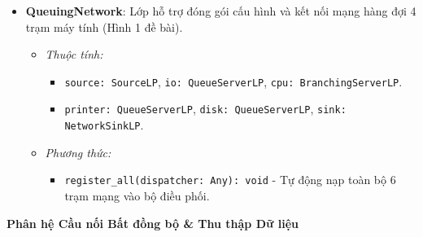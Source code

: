 \begin{itemize}[leftmargin=1.5em, itemsep=8pt]
\item \textbf{QueuingNetwork}: Lớp hỗ trợ đóng gói cấu hình và kết nối mạng hàng đợi 4 trạm máy tính (Hình 1 đề bài).

\begin{itemize}[leftmargin=1.2em, label={}, itemsep=3pt]
\item[\textendash] \textit{Thuộc tính:}
\begin{itemize}[leftmargin=1.5em, label=+, itemsep=2pt]
\item \texttt{source: SourceLP}, \texttt{io: QueueServerLP}, \texttt{cpu: BranchingServerLP}.
\item \texttt{printer: QueueServerLP}, \texttt{disk: QueueServerLP}, \texttt{sink: NetworkSinkLP}.
\end{itemize}

\item[\textendash] \textit{Phương thức:}
\begin{itemize}[leftmargin=1.5em, label=+, itemsep=2pt]
\item \texttt{register\_all(dispatcher: Any): void} - Tự động nạp toàn bộ 6 trạm mạng vào bộ điều phối.
\end{itemize}
\end{itemize}
\end{itemize}

\textbf{\color{red}Phân hệ Cầu nối Bất đồng bộ \& Thu thập Dữ liệu}

